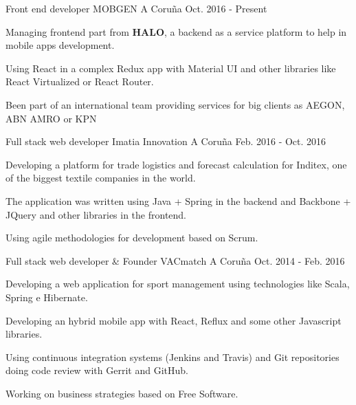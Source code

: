 


\begin{cventries}


\cventry
{Front end developer} %
{MOBGEN} %
{A Coruña} %
{Oct. 2016 - Present} %
{ %
\begin{cvitems}
\item {Managing frontend part from \textbf{HALO}, a backend as a service 
platform to help in mobile apps development.}
\item {Using React in a complex Redux app with Material UI and other libraries 
like React Virtualized or React Router.}
\item {Been part of an international team providing services for big clients as 
AEGON, ABN AMRO or KPN}
\end{cvitems}
}

\cventry
{Full stack web developer} %
{Imatia Innovation} %
{A Coruña} %
{Feb. 2016 - Oct. 2016} %
{ %
\begin{cvitems}
\item {Developing a platform for trade logistics and forecast 
calculation for Inditex, one of the biggest textile companies in the world.}
\item {The application was written using Java + Spring in the backend and
Backbone + JQuery and other libraries in the frontend.}
\item {Using agile methodologies for development based on Scrum.}
\end{cvitems}
}

\cventry
{Full stack web developer \& Founder} %
{VACmatch} %
{A Coruña} %
{Oct. 2014 - Feb. 2016} %
{ %
\begin{cvitems}
\item {Developing a web application for sport management using 
technologies like Scala, Spring e Hibernate.}
\item {Developing an hybrid mobile app with React, Reflux and some other 
Javascript libraries.}
\item {Using continuous integration systems (Jenkins and Travis) and Git 
repositories doing code review with Gerrit and GitHub.}
\item {Working on business strategies based on Free Software.}
\end{cvitems}
}



\end{cventries}